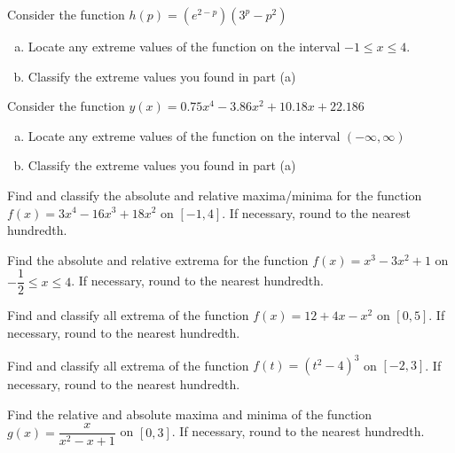 \documentclass[notes]{subfiles}
\begin{document}
		\begin{ex}
			Consider the function $h(p) = (e^{2-p})(3^p-p^2)$
			\begin{enumerate}[(a)]
				\item Locate any extreme values of the function on the interval $-1\leq x\leq 4$.
				\item Classify the extreme values you found in part (a)
			\end{enumerate}
		\end{ex}
			\newpage
			
		\begin{ex}
			Consider the function $y(x) = 0.75x^4-3.86x^2+10.18x + 22.186$
			\begin{enumerate}[(a)] 
				\item Locate any extreme values of the function on the interval $(-\infty,\infty)$
					\vs{1}
				\item Classify the extreme values you found in part (a)
					\vs{2}
			\end{enumerate}
		\end{ex}
		
		\begin{ex}
			Find and classify the absolute and relative maxima/minima for the function $f(x) = 3x^4-16x^3+18x^2$ on $[-1,4]$.  If necessary, round to the nearest hundredth.
		\end{ex}
			\vs{2}
			\newpage
			
		\begin{ex}
			Find the absolute and relative extrema for the function $f(x) = x^3-3x^2 + 1$ on $-\dfrac{1}{2}\leq x\leq 4$.  If necessary, round to the nearest hundredth.
		\end{ex}
			
		\begin{ex}
			Find and classify all extrema of the function $f(x) = 12 + 4x - x^2$ on $[0,5]$.  If necessary, round to the nearest hundredth.
		\end{ex}
			\vs{1}
			\newpage
			
		\begin{ex}
			Find and classify all extrema of the function $f(t) = (t^2-4)^3$ on $[-2,3]$.  If necessary, round to the nearest hundredth.
		\end{ex}
			\vs{1}
		\begin{ex}
			Find the relative and absolute maxima and minima of the function $g(x) = \dfrac{x}{x^2-x+1}$ on $[0,3]$.  If necessary, round to the nearest hundredth.
		\end{ex}
			\newpage
			
\end{document}
